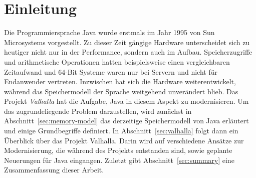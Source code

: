\section{Einleitung}\label{sec:introduction}

Die Programmiersprache Java wurde erstmals im Jahr 1995 von Sun Microsystems vorgestellt.
Zu dieser Zeit gängige Hardware unterscheidet sich zu heutiger nicht nur in der Performance, sondern auch im Aufbau.
Speicherzugriffe und arithmetische Operationen hatten beispielsweise einen vergleichbaren Zeitaufwand und 64-Bit Systeme waren nur bei Servern und nicht für Endanwender vertreten.
Inzwischen hat sich die Hardware weiterentwickelt, während das Speichermodell der Sprache weitgehend unverändert blieb.
Das Projekt \emph{Valhalla} hat die Aufgabe, Java in diesem Aspekt zu modernisieren.
Um das zugrundeliegende Problem darzustellen, wird zunächst in Abschnitt~\ref{sec:memory-model} das derzeitige Speichermodell von Java erläutert und einige Grundbegriffe definiert.
In Abschnitt~\ref{sec:valhalla} folgt dann ein Überblick über das Projekt Valhalla.
Darin wird auf verschiedene Ansätze zur Modernisierung, die während des Projekts entstanden sind, sowie geplante Neuerungen für Java eingangen.
Zuletzt gibt Abschnitt~\ref{sec:summary} eine Zusammenfassung dieser Arbeit.
